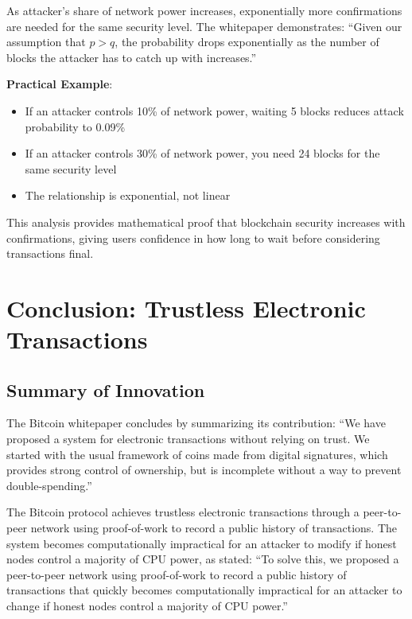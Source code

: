 As attacker's share of network power increases, exponentially more confirmations are needed for the same security level. The whitepaper demonstrates: ``Given our assumption that $p>q$, the probability drops exponentially as the number of blocks the attacker has to catch up with increases.''

\textbf{Practical Example}:
\begin{itemize}
  \item If an attacker controls 10\% of network power, waiting 5 blocks reduces attack probability to 0.09\%
  \item If an attacker controls 30\% of network power, you need 24 blocks for the same security level
  \item The relationship is exponential, not linear
\end{itemize}

This analysis provides mathematical proof that blockchain security increases with confirmations, giving users confidence in how long to wait before considering transactions final.


\section{Conclusion: Trustless Electronic Transactions}
\label{sec:ch03-conclusion}

\subsection{Summary of Innovation}
\label{subsec:innovation-summary}

The Bitcoin whitepaper concludes by summarizing its contribution: ``We have proposed a system for electronic transactions without relying on trust. We started with the usual framework of coins made from digital signatures, which provides strong control of ownership, but is incomplete without a way to prevent double-spending.''

The Bitcoin protocol achieves trustless electronic transactions through a peer-to-peer network using proof-of-work to record a public history of transactions. The system becomes computationally impractical for an attacker to modify if honest nodes control a majority of CPU power, as stated: ``To solve this, we proposed a peer-to-peer network using proof-of-work to record a public history of transactions that quickly becomes computationally impractical for an attacker to change if honest nodes control a majority of CPU power.''

